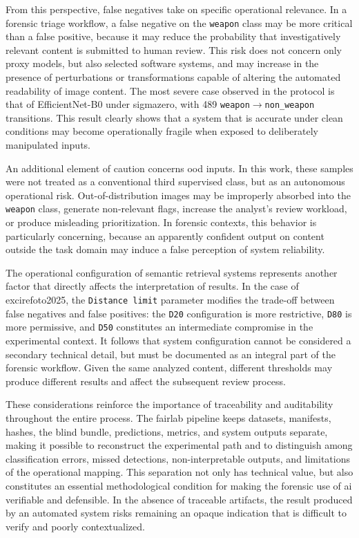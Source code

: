 From this perspective, false negatives take on specific operational relevance.
In a forensic triage workflow, a false negative on the \texttt{weapon} class may
be more critical than a false positive, because it may reduce the probability
that investigatively relevant content is submitted to human review. This risk
does not concern only proxy models, but also selected software systems, and may
increase in the presence of perturbations or transformations capable of
altering the automated readability of image content. The most severe case
observed in the protocol is that of EfficientNet-B0 under \gls{sigmazero}, with
489 \texttt{weapon}\(\rightarrow\)\texttt{non\_weapon} transitions. This result
clearly shows that a system that is accurate under clean conditions may become
operationally fragile when exposed to deliberately manipulated inputs.

An additional element of caution concerns \gls{ood} inputs. In this work, these
samples were not treated as a conventional third supervised class, but as an
autonomous operational risk. Out-of-distribution images may be improperly
absorbed into the \texttt{weapon} class, generate non-relevant flags, increase
the analyst's review workload, or produce misleading prioritization. In forensic
contexts, this behavior is particularly concerning, because an apparently
confident output on content outside the task domain may induce a false
perception of system reliability.

The operational configuration of semantic retrieval systems represents another
factor that directly affects the interpretation of results. In the case of
\gls{excirefoto2025}, the \texttt{Distance limit} parameter modifies the
trade-off between false negatives and false positives: the \texttt{D20}
configuration is more restrictive, \texttt{D80} is more permissive, and
\texttt{D50} constitutes an intermediate compromise in the experimental context.
It follows that system configuration cannot be considered a secondary technical
detail, but must be documented as an integral part of the forensic workflow.
Given the same analyzed content, different thresholds may produce different
results and affect the subsequent review process.

These considerations reinforce the importance of traceability and auditability
throughout the entire process. The \gls{fairlab} pipeline keeps datasets,
manifests, hashes, the blind bundle, predictions, metrics, and system outputs
separate, making it possible to reconstruct the experimental path and to
distinguish among classification errors, missed detections, non-interpretable
outputs, and limitations of the operational mapping. This separation not only
has technical value, but also constitutes an essential methodological condition
for making the forensic use of \gls{ai} verifiable and defensible. In the
absence of traceable artifacts, the result produced by an automated system risks
remaining an opaque indication that is difficult to verify and poorly
contextualized.

